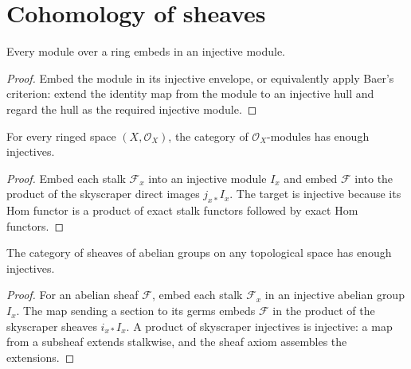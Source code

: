 \section{Cohomology of sheaves}
\label{ha-ch3-sec2}
\begin{proposition}
\label{ha-ch3-prop-module-injective}
Every module over a ring embeds in an injective module.

\end{proposition}
\begin{proof}

Embed the module in its injective envelope, or equivalently apply Baer's criterion: extend the
identity map from the module to an injective hull and regard the hull as the required injective module.

\end{proof}
\begin{proposition}
\label{ha-ch3-prop-sheaf-injective}
For every ringed space $(X,\mathcal O_X)$, the category of $\mathcal O_X$-modules
has enough injectives.

\end{proposition}
\begin{proof}

Embed each stalk $\mathcal F_x$ into an injective module $I_x$ and embed
$\mathcal F$ into the product of the skyscraper direct images $j_{x*}I_x$.
The target is injective because its Hom functor is a product of exact stalk
functors followed by exact Hom functors.

\end{proof}
\begin{corollary}
\label{ha-ch3-cor-sheaf-injective}
The category of sheaves of abelian groups on any topological space has enough
injectives.

\end{corollary}
\begin{proof}

For an abelian sheaf $\mathcal F$, embed each stalk $\mathcal F_x$ in an injective abelian group
$I_x$.  The map sending a section to its germs embeds $\mathcal F$ in the product of the skyscraper
sheaves $i_{x*}I_x$.  A product of skyscraper injectives is injective: a map from a subsheaf extends
stalkwise, and the sheaf axiom assembles the extensions.

\end{proof}
